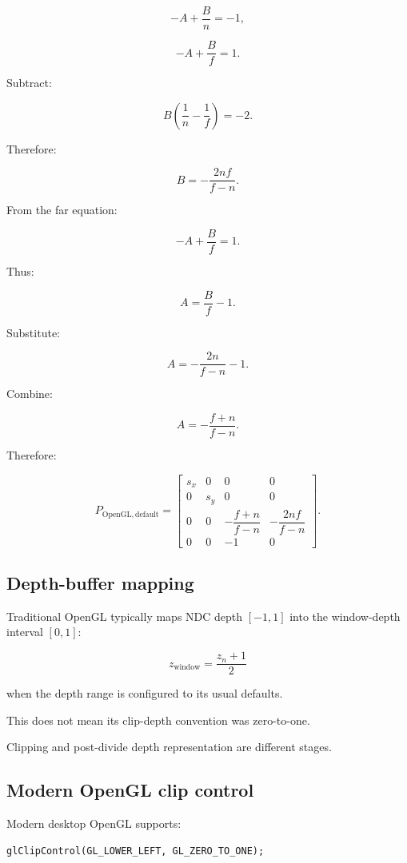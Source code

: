 \[
 -A+\frac Bn=-1,
\]

\[
 -A+\frac Bf=1.
\]

Subtract:

\[
 B\left(\frac1n-\frac1f\right)=-2.
\]

Therefore:

\[
 B=-\frac{2nf}{f-n}.
\]

From the far equation:

\[
 -A+\frac Bf=1.
\]

Thus:

\[
 A=\frac Bf-1.
\]

Substitute:

\[
 A=-\frac{2n}{f-n}-1.
\]

Combine:

\[
 \boxed{ A=-\frac{f+n}{f-n} }.
\]

Therefore:

\[
 \boxed{ P_{\mathrm{OpenGL,default}}= \begin{bmatrix} s_x&0&0&0\\ 0&s_y&0&0\\ 0&0&-\dfrac{f+n}{f-n}&-\dfrac{2nf}{f-n}\\ 0&0&-1&0 \end{bmatrix} }.
\]

\subsection{Depth-buffer mapping}\label{02-foundations-ii-ch033-depth-buffer-mapping}

Traditional OpenGL typically maps NDC depth \([-1,1]\) into the window-depth interval \([0,1]\):

\[
 \boxed{ z_{\mathrm{window}}=\frac{z_n+1}{2} }
\]

when the depth range is configured to its usual defaults.

This does not mean its clip-depth convention was zero-to-one.

Clipping and post-divide depth representation are different stages.

\subsection{Modern OpenGL clip control}\label{02-foundations-ii-ch033-modern-opengl-clip-control}

Modern desktop OpenGL supports:

\begin{verbatim}
glClipControl(GL_LOWER_LEFT, GL_ZERO_TO_ONE);
\end{verbatim}

